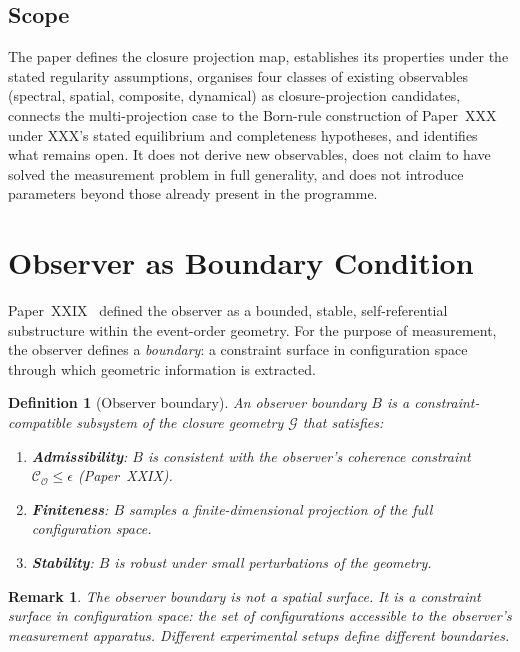 \documentclass[12pt]{article}
\newtheorem{definition}[theorem]{Definition}
\newtheorem{remark}[theorem]{Remark}
\newcommand{\Ocal}{\mathcal{O}}
\newcommand{\Ccal}{\mathcal{C}}
\newcommand{\Gcal}{\mathcal{G}}
\begin{document}
\subsection*{Scope}

The paper defines the closure projection map, establishes its properties under the stated regularity assumptions, organises four classes of existing observables (spectral, spatial, composite, dynamical) as closure-projection candidates, connects the multi-projection case to the Born-rule construction of Paper~XXX under XXX's stated equilibrium and completeness hypotheses, and identifies what remains open. It does not derive new observables, does not claim to have solved the measurement problem in full generality, and does not introduce parameters beyond those already present in the programme.

\section{Observer as Boundary Condition}\label{sec:observer}

Paper~XXIX~\citep{SmartXXIX} defined the observer as a bounded, stable, self-referential substructure within the event-order geometry. For the purpose of measurement, the observer defines a \textit{boundary}: a constraint surface in configuration space through which geometric information is extracted.

\begin{definition}[Observer boundary]\label{def:boundary}
An \textit{observer boundary} $B$ is a constraint-compatible subsystem of the closure geometry $\Gcal$ that satisfies:
\begin{enumerate}
    \item \textbf{Admissibility}: $B$ is consistent with the observer's coherence constraint $\Ccal_\Ocal \leq \epsilon$ (Paper~XXIX).
    \item \textbf{Finiteness}: $B$ samples a finite-dimensional projection of the full configuration space.
    \item \textbf{Stability}: $B$ is robust under small perturbations of the geometry.
\end{enumerate}
\end{definition}

\begin{remark}
The observer boundary is not a spatial surface. It is a constraint surface in configuration space: the set of configurations accessible to the observer's measurement apparatus. Different experimental setups define different boundaries.
\end{remark}
\end{document}
